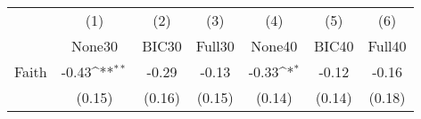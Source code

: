 {
\def\sym#1{\ifmmode^{#1}\else\(^{#1}\)\fi}
\begin{tabular}{l*{6}{c}}
\toprule
            &\multicolumn{1}{c}{(1)}&\multicolumn{1}{c}{(2)}&\multicolumn{1}{c}{(3)}&\multicolumn{1}{c}{(4)}&\multicolumn{1}{c}{(5)}&\multicolumn{1}{c}{(6)}\\
            &\multicolumn{1}{c}{None30}&\multicolumn{1}{c}{BIC30}&\multicolumn{1}{c}{Full30}&\multicolumn{1}{c}{None40}&\multicolumn{1}{c}{BIC40}&\multicolumn{1}{c}{Full40}\\
\midrule
Faith       &       -0.43\sym{**} &       -0.29         &       -0.13         &       -0.33\sym{*}  &       -0.12         &       -0.16         \\
            &      (0.15)         &      (0.16)         &      (0.15)         &      (0.14)         &      (0.14)         &      (0.18)         \\
\bottomrule
\end{tabular}
}
